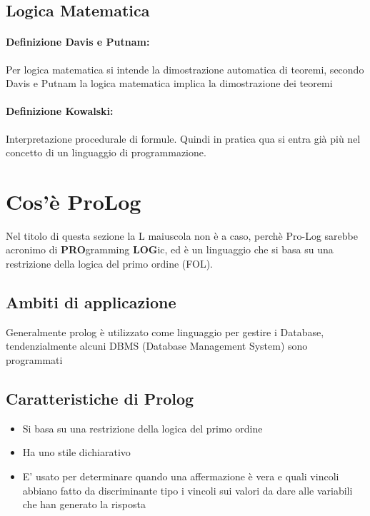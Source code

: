 \documentclass[12pt, a4paper, openany, oneside]{book}
\begin{document}
\subsection{Logica Matematica}
\paragraph{Definizione Davis e Putnam: } Per logica matematica si intende la
dimostrazione automatica di teoremi, secondo Davis e Putnam la logica matematica
implica la dimostrazione dei teoremi
\paragraph{Definizione Kowalski: } Interpretazione procedurale di formule. 
Quindi in pratica qua si entra già più nel concetto di un linguaggio
di programmazione.
\section{Cos'è ProLog}
Nel titolo di questa sezione la L maiuscola non è a caso, perchè Pro-Log sarebbe
acronimo di \textbf{PRO}gramming \textbf{LOG}ic, ed è un linguaggio che si basa
su una restrizione della logica del primo ordine (FOL).
\subsection{Ambiti di applicazione}
Generalmente prolog è utilizzato come linguaggio per gestire i Database, 
tendenzialmente alcuni DBMS (Database Management System) sono programmati 
\subsection{Caratteristiche di Prolog}
\begin{itemize}
	\item Si basa su una restrizione della logica del primo ordine
	\item Ha uno stile dichiarativo
	\item E' usato per determinare quando una affermazione è vera e quali vincoli
	abbiano fatto da discriminante tipo i vincoli sui valori da dare alle 
	variabili che han generato la risposta
\end{itemize}
\end{document}
